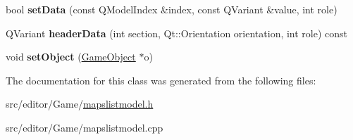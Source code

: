 \begin{DoxyCompactItemize}
\item 
\hypertarget{class_object_flag_table_model_a60e32db4479e6f6601d417bfa379c6be}{bool {\bfseries set\-Data} (const \-Q\-Model\-Index \&index, const \-Q\-Variant \&value, int role)}\label{class_object_flag_table_model_a60e32db4479e6f6601d417bfa379c6be}

\item 
\hypertarget{class_object_flag_table_model_a5e70255c0576392997be23d66580ba46}{\-Q\-Variant {\bfseries header\-Data} (int section, \-Qt\-::\-Orientation orientation, int role) const }\label{class_object_flag_table_model_a5e70255c0576392997be23d66580ba46}

\item 
\hypertarget{class_object_flag_table_model_aef141c41011b941005044c463cede052}{void {\bfseries set\-Object} (\hyperlink{class_game_object}{\-Game\-Object} $\ast$o)}\label{class_object_flag_table_model_aef141c41011b941005044c463cede052}

\end{DoxyCompactItemize}


\-The documentation for this class was generated from the following files\-:\begin{DoxyCompactItemize}
\item 
src/editor/\-Game/\hyperlink{mapslistmodel_8h}{mapslistmodel.\-h}\item 
src/editor/\-Game/mapslistmodel.\-cpp\end{DoxyCompactItemize}
